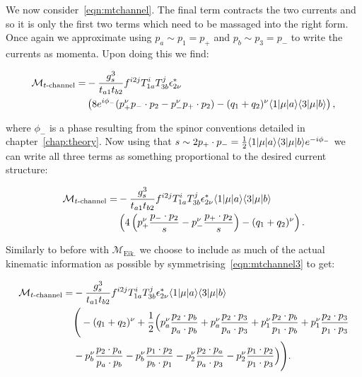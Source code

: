 	We now consider~\eqref{eqn:mtchannel}.  The final term contracts the two currents and so it is
	only the first two terms which need to be massaged into the right form.  Once again we
	approximate using $p_a\sim p_1=p_+$ and $p_b\sim p_3=p_-$ to write the currents as momenta.
	Upon doing this we find:

	\begin{align}
	\begin{split}
		\mathcal{M}_{t\text{-channel}} = &-\frac{g_s^3}{t_{a1}t_{b2}}f^{i2j}T^i_{1a}T^j_{3b} \epsilon^*_{2\nu} \\
		&\left(8e^{i\phi_-}(p_+^\nu p_-\cdot p_2 - p_-^\nu p_+\cdot p_2) - (q_1 + q_2)^\nu \langle 1 | \mu | a \rangle\langle 3 | \mu | b \rangle \right),
		\label{eqn:mtchannel2}
	\end{split}
	\end{align}

	where $\phi_-$ is a phase resulting from the spinor conventions detailed in chapter~\ref{chap:theory}.
	Now using that $s\sim2p_+\cdot p_-=\frac{1}{2}\langle 1 | \mu | a \rangle\langle 3 | \mu | b \rangle e^{-i\phi_-}$ we can write all
	three terms as something proportional to the desired current structure:

	\begin{align}
	\begin{split}
		\mathcal{M}_{t\text{-channel}} = &-\frac{g_s^3}{t_{a1}t_{b2}}f^{i2j}T^i_{1a}T^j_{3b} \epsilon^*_{2\nu}
		\langle 1 | \mu | a \rangle\langle 3 | \mu | b \rangle \\&\left(4\left(p_+^\nu \frac{p_-\cdot p_2}{s} - p_-^\nu \frac{p_+\cdot p_2}{s}\right)
		- (q_1 + q_2)^\nu \right).
		\label{eqn:mtchannel3}
	\end{split}
	\end{align}

	Similarly to before with $\mathcal{M}_{\text{Eik.}}$ we choose to include as much of the actual
	kinematic information as possible by symmetrising~\eqref{eqn:mtchannel3} to get:

	\begin{align}
	\begin{split}
		\mathcal{M}_{t\text{-channel}} = &-\frac{g_s^3}{t_{a1}t_{b2}}f^{i2j}T^i_{1a}T^j_{3b} \epsilon^*_{2\nu}
		\langle 1 | \mu | a \rangle\langle 3 | \mu | b \rangle\\
		&\Bigg(-(q_1 + q_2)^\nu + \frac{1}{2}\Big(
		p_a^\nu \frac{p_2\cdot p_b}{p_a\cdot p_b} + p_a^\nu \frac{p_2\cdot p_3}{p_a\cdot p_3} +
		p_1^\nu \frac{p_2\cdot p_b}{p_1\cdot p_b} + p_1^\nu \frac{p_2\cdot p_3}{p_1\cdot p_3}  \\
	       &-p_b^\nu \frac{p_2\cdot p_a}{p_a\cdot p_b} - p_b^\nu \frac{p_1\cdot p_2}{p_b\cdot p_1} -
		p_2^\nu \frac{p_2\cdot p_a}{p_a\cdot p_3} - p_2^\nu \frac{p_1\cdot p_2}{p_1\cdot p_3}
		\Big)
		\Bigg).
		\label{eqn:mtchannel4}
	\end{split}
	\end{align}

